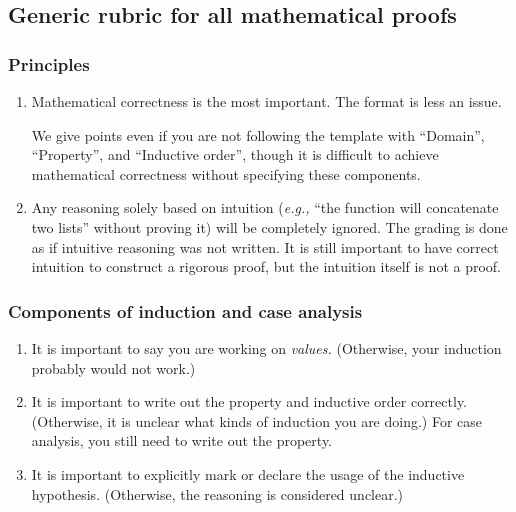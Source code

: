 \documentclass[fleqn]{article}
\begin{document}
\subsection*{Generic rubric for all mathematical proofs}

\subsubsection*{Principles}
\begin{enumerate}
  \item Mathematical correctness is the most important. The format is less an issue.

    We give points even if you are not following the template with ``Domain'', ``Property'', and ``Inductive order'', though it is difficult to achieve mathematical correctness without specifying these components.

  \item Any reasoning solely based on intuition (\emph{e.g.,} ``the  function will concatenate two lists'' without proving it) will be completely ignored. The grading is done as if intuitive reasoning was not written. It is still important to have correct intuition to construct a rigorous proof, but the intuition itself is not a proof.
\end{enumerate}

\subsubsection*{Components of induction and case analysis}
\begin{enumerate}
  \item It is important to say you are working on \emph{values.} (Otherwise, your induction probably would not work.)
  \item It is important to write out the property and inductive order correctly. (Otherwise, it is unclear what kinds of induction you are doing.) For case analysis, you still need to write out the property.
  \item It is important to explicitly mark or declare the usage of the inductive hypothesis. (Otherwise, the reasoning is considered unclear.)
\end{enumerate}
\end{document}
